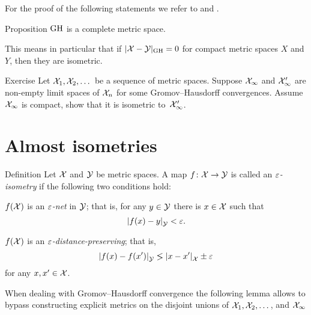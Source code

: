 For the proof of the following statements we refer to \cite{burago-burago-ivanov} and \cite{petrunin2023pure}.

\begin{thm}{Proposition}\label{prop:complete}
$\operatorname{\rm GH}\nolimits$ is a complete metric space.
\end{thm}

This means in particular that if $|\mathcal{X}-\mathcal{Y}|_{\operatorname{\rm GH}\nolimits}=0$ for compact metric spaces $X$ and $Y$, then they are isometric.

\begin{thm}{Exercise}\label{ex:compact-GH}
Let $\mathcal{X}_1,\mathcal{X}_2,\dots$ be a sequence of metric spaces.
Suppose $\mathcal{X}_\infty$ and $\mathcal{X}_\infty'$ are non-empty limit spaces of $\mathcal{X}_n$ for some Gromov--Hausdorff convergences.
Assume $\mathcal{X}_\infty$ is compact, show that it is isometric to~$\mathcal{X}_\infty'$.
\end{thm}

\section{Almost isometries}\label{sec:Almost isometries}

\begin{thm}{Definition}
Let $\mathcal{X}$ and $\mathcal{Y}$ be metric spaces.
A map $f\colon\mathcal{X}\to\mathcal{Y}$
is called an \emph{$\varepsilon$-isometry}
if the following two conditions hold:

\begin{subthm}{}
$f(\mathcal{X})$ is an \emph{$\varepsilon$-net} in $\mathcal{Y}$; that is, for any $y\in \mathcal{Y}$ there is $x\in \mathcal{X}$ such that
\[|{f(x)}-{y}|_{\mathcal{Y}}^{{}}<\varepsilon.\]
\end{subthm}

\begin{subthm}{}
$f(\mathcal{X})$ is an \emph{$\varepsilon$-distance-preserving}; that is,
\[\dist{f(x)}{f(x')}{\spc{Y}}\lg \dist{x}{x'}{\spc{X}}\pm\eps \]
for any $x,x'\in\mathcal{X}$.
\end{subthm}

\end{thm}

When dealing with Gromov--Hausdorff convergence the following lemma allows to bypass constructing explicit metrics on the disjoint unions of $\mathcal{X}_1,\mathcal{X}_2,\dots$, and $\mathcal{X}_\infty$

